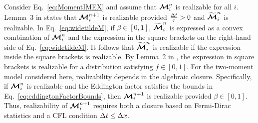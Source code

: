 Consider Eq.~\eqref{eq:MomentIMEX} and assume that $\boldsymbol{\mathcal{M}}_{i}^{n}$ is realizable for all $i$.  
Lemma~3 in \cite{chu_etal_2018} states that $\boldsymbol{\mathcal{M}}^{n+1}_{i}$ is realizable provided $\frac{\Delta t}{\tau} > 0$ and $\widetilde{\boldsymbol{\mathcal{M}}}^{n}_{i}$ is realizable.  
In Eq.~\eqref{eq:widetildeM}, if $\beta \in [0,1]$, $\widetilde{\boldsymbol{\mathcal{M}}}^{n}_{i}$ is expressed as a convex combination of $\boldsymbol{\mathcal{M}}_{i}^{n}$ and the expression in the square brackets on the right-hand side of Eq.~\eqref{eq:widetildeM}.  
It follows that $\widetilde{\boldsymbol{\mathcal{M}}}^{n}_{i}$ is realizable if the expression inside the square brackets is realizable.  
By Lemma~2 in \cite{chu_etal_2018}, the expression in square brackets is realizable for a distribution satisfying $f\in[0,1]$.  
For the two-moment model considered here, realizability depends in the algebraic closure.  
Specifically, if $\boldsymbol{\mathcal{M}}_{i}^{n}$ is realizable and the Eddington factor satisfies the bounds in Eq.~\eqref{eq:eddingtonFactorBounds}, then $\boldsymbol{\mathcal{M}}^{n+1}_{i}$ is realizable provided $\beta \in [0,1]$.  
Thus, realizability of $\boldsymbol{\mathcal{M}}^{n+1}_{i}$ requires both a closure based on Fermi-Dirac statistics and a CFL condition $\Delta t\le\Delta x$.  